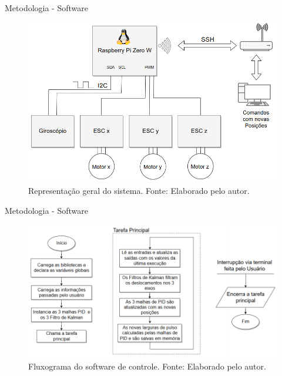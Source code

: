 \documentclass{beamer}
\begin{document}
\begin{frame}{Metodologia - Software}
    \begin{figure}[HT]
		\begin{center}
		\captionsetup{justification=centering}
        \includegraphics[scale=.45]{../metodologia/img/comunicacao_projeto}
        \caption{Representação geral do sistema. \newline
        		 Fonte: Elaborado pelo autor.}
		\label{FIG_ADAPTATIVO}
        \end{center}
	\end{figure}
\end{frame}


\begin{frame}{Metodologia - Software}
    \begin{figure}[HT]
		\begin{center}
		\captionsetup{justification=centering}
        \includegraphics[scale=.45]{../metodologia/img/software_model}
        \caption{Fluxograma do software de controle. \newline
        		 Fonte: Elaborado pelo autor.}
		\label{fig:software_model}
        \end{center}
	\end{figure}
\end{frame}
\end{document}
